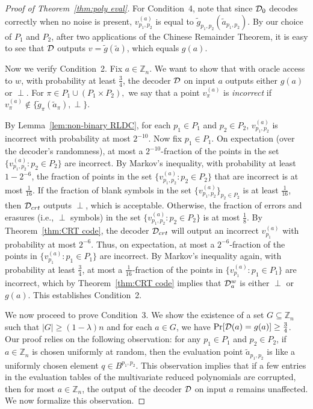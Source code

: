 \documentclass[11pt,english]{article}
\theoremstyle{definition}
\theoremstyle{remark}
\newcommand{\D}{{\cal D}}
\newcommand{\Z}{\mathbb{Z}}
\begin{document}
\begin{proof}[Proof of Theorem~\ref{thm:poly eval}]
For Condition~4, note that since $\D_{0}$ decodes correctly when
no noise is present, $v_{p_{1},p_{2}}^{(a)}$ is equal to $\tilde{g}_{p_{1},p_{2}}(\tilde{a}_{p_{1},p_{2}})$.
By our choice of $P_1$ and $P_2$, after two applications of the Chinese Remainder Theorem, it is easy to see that
$\D$ outputs $v=\tilde{g}(\tilde{a})$, which equals $g(a)$.

Now we verify Condition~2. Fix $a\in\Z_{n}.$ We want to show that
with oracle access to $w$, with probability at least $\frac{3}{4}$, the decoder $\D$ on input $a$ outputs either $g(a)$
or $\perp$.
For $\pi\in P_{1}\cup(P_{1}\times P_{2}),$
we say that a point $v_{\pi}^{(a)}$ is \emph{incorrect} if $v_{\pi}^{(a)}\notin\{\tilde{g}_{\pi}(\tilde{a}_{\pi}),\perp\}$. 

By Lemma~\ref{lem:non-binary RLDC}, for each $p_{1} \in P_1$ and $p_{2}\in P_2$, $v_{p_{1},p_{2}}^{(a)}$ is incorrect with probability at most $2^{-10}$. Now fix $p_{1}\in P_{1}$. On expectation (over the decoder's randomness), at
most a $2^{-10}$-fraction of the points in the set $\{v_{p_{1},p_{2}}^{(a)}:p_{2}\in P_{2}\}$
are incorrect. By Markov's inequality, with probability at least $1-2^{-6}$,
the fraction of points in the set $\{v_{p_{1},p_{2}}^{(a)}:p_{2}\in P_{2}\}$
that are incorrect is at most $\frac{1}{16}$. If the fraction of
blank symbols in the set $\{v_{p_{1},p_{2}}^{(a)}\}_{p_{2}\in P_{2}}$
is at least $\frac{1}{16}$, then $\D_{crt}$ outputs $\perp$, which
is acceptable. Otherwise, the fraction of errors and erasures (i.e., $\perp$ symbols) in
the set $\{v_{p_{1},p_{2}}^{(a)}:p_{2}\in P_{2}\}$ is at most $\frac{1}{8}$.
By Theorem~\ref{thm:CRT code}, the decoder $\D_{crt}$ will output an incorrect $v_{p_{1}}^{(a)}$
with probability at most $2^{-6}$. 
Thus, on expectation, at most a $2^{-6}$-fraction of the points in $\{v_{p_1}^{(a)}:p_1 \in P_1\}$ are incorrect.
By Markov's inequality again, with probability at least $\frac{3}{4}$, at most a $\frac{1}{16}$-fraction of the points in  $\{v_{p_1}^{(a)}:p_1 \in P_1\}$ are incorrect, which by Theorem~\ref{thm:CRT code} implies that $\D^w_a$ is either $\perp$ or $g(a)$.
This establishes Condition~2.

We now proceed to prove Condition~3. We show the existence of a set
$G\subseteq\Z_{n}$ such that $|G|\geq(1-\lambda) n$ and for each $a\in G$,
we have $\Pr[\D(a)=g(a)]\geq\frac{3}{4}$.
Our proof relies on the following observation: for any $p_{1}\in P_{1}$
and $p_{2}\in P_{2}$, if $a\in\Z_{n}$ is chosen uniformly at random,
then the evaluation point $\tilde{a}_{p_{1},p_{2}}$ is like a uniformly chosen element $q\in B^{p_{1},p_{2}}$. 
This observation implies that if a few entries in the evaluation tables of the
multivariate reduced polynomials are corrupted, then for most $a\in\Z_n$, the output of the decoder $\D$ on input $a$ remains unaffected. We now formalize this observation. 


\end{proof}
\end{document}
